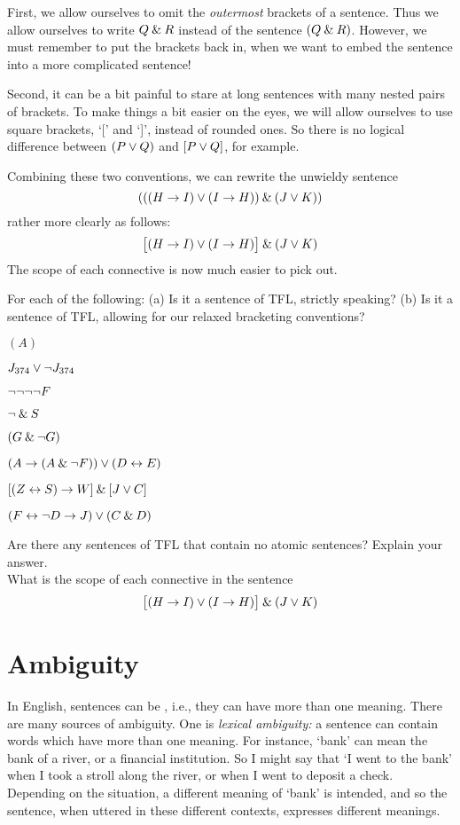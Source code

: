 First,  we allow ourselves to omit the \emph{outermost} brackets of a sentence. Thus we allow ourselves to write $Q \mathbin{\&} R$ instead of the sentence $(Q \mathbin{\&} R)$. However, we must remember to put the brackets back in, when we want to embed the sentence into a more complicated sentence!

Second, it can be a bit painful to stare at long sentences with many nested pairs of brackets. To make things a bit easier on the eyes, we will  allow ourselves to use square brackets, `[' and `]', instead of rounded ones. So there is no logical difference between $(P\vee Q)$ and $[P\vee Q]$, for example. 

Combining these two conventions, we can rewrite the unwieldy sentence
$$(((H \rightarrow I) \vee (I \rightarrow H)) \mathbin{\&} (J \vee K))$$
rather more clearly as follows:
$$\bigl[(H \rightarrow I) \vee (I \rightarrow H)\bigr] \mathbin{\&} (J \vee K)$$
The scope of each connective is now much easier to pick out.

\practiceproblems

\solutions
\problempart
\label{pr.wiffTFL}
For each of the following: (a) Is it a sentence of TFL, strictly speaking? (b) Is it a sentence of TFL, allowing for our relaxed bracketing conventions?
\begin{earg}
\item $(A)$
\item $J_{374} \vee \neg J_{374}$
\item $\neg \neg \neg \neg F$
\item $\neg \mathbin{\&} S$
\item $(G \mathbin{\&} \neg G)$
\item $(A \rightarrow (A \mathbin{\&} \neg F)) \vee (D \leftrightarrow E)$
\item $[(Z \leftrightarrow S) \rightarrow W] \mathbin{\&} [J \vee C]$
\item $(F \leftrightarrow \neg D \rightarrow J) \vee (C \mathbin{\&} D)$
\end{earg}

\problempart
Are there any sentences of TFL that contain no atomic sentences? Explain your answer.\\

\problempart
What is the scope of each connective in the sentence
$$\bigl[(H \rightarrow I) \vee (I \rightarrow H)\bigr] \mathbin{\&} (J \vee K)$$

\chapter{Ambiguity}\label{s:AbmbiguityTFL}

In English, sentences can be , i.e., they can have more than one meaning.  There are many sources of ambiguity. One is \emph{lexical ambiguity:} a sentence can contain words which have more than one meaning.  For instance, `bank' can mean the bank of a river, or a financial institution. So I might say that `I went to the bank' when I took a stroll along the river, or when I went to deposit a check.  Depending on the situation, a different meaning of `bank' is intended, and so the sentence, when uttered in these different contexts, expresses different meanings.

